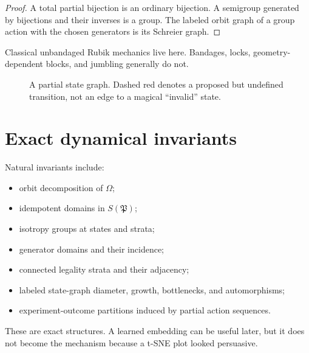 \documentclass[11pt,openany]{book}
\newcommand{\Atlas}{\mathfrak P}
\newcommand{\States}{\Omega}
\theoremstyle{polyplain}
\theoremstyle{polydef}
\begin{document}
\begin{proof}
A total partial bijection is an ordinary bijection. A semigroup generated by bijections and their inverses is a group. The labeled orbit graph of a group action with the chosen generators is its Schreier graph.
\end{proof}

Classical unbandaged Rubik mechanics live here. Bandages, locks, geometry-dependent blocks, and jumbling generally do not.

\begin{figure}[htbp]
\centering
{}
\caption{A partial state graph. Dashed red denotes a proposed but undefined transition, not an edge to a magical ``invalid'' state.}
\label{fig:partial-state-graph}
\end{figure}

\section{Exact dynamical invariants}

Natural invariants include:
\begin{itemize}
  \item orbit decomposition of $\States$;
  \item idempotent domains in $S(\Atlas)$;
  \item isotropy groups at states and strata;
  \item generator domains and their incidence;
  \item connected legality strata and their adjacency;
  \item labeled state-graph diameter, growth, bottlenecks, and automorphisms;
  \item experiment-outcome partitions induced by partial action sequences.
\end{itemize}
These are exact structures. A learned embedding can be useful later, but it does not become the mechanism because a t-SNE plot looked persuasive.
\end{document}
